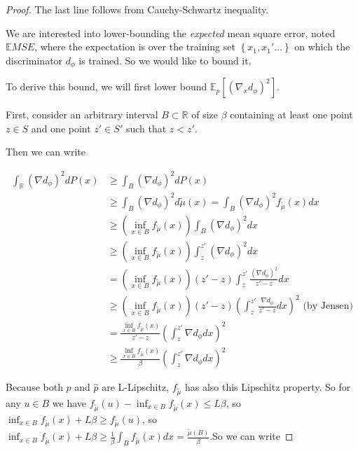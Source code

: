 \begin{proof}
    The last line follows from Cauchy-Schwartz inequality.
    
    We are interested into lower-bounding the \emph{expected} mean square
    error, noted $\mathbb{E}MSE$, where the expectation is over the training
    set $\left\{ x_{1},x_{1}'\ldots\right\} $ on which the discriminator
    $d_{\phi}$ is trained. So we would like to bound it.
    
    To derive this bound, we will first lower bound $\mathbb{E}_{p}\left[\left(\nabla_{x}d_{\phi}\right)^{2}\right]$.
    
    First, consider an arbitrary interval $B\subset\mathbb{R}$ of size
    $\beta$ containing at least one point $z\in S$ and one point $z'\in S'$
    such that $z<z'$.
    
    Then we can write
    
    \begin{align*}
    \int_{\mathbb{R}}\left(\nabla d_{\phi}\right)^{2}dP(x) & \ge\int_{B}\left(\nabla d_{\phi}\right)^{2}dP(x)\\
     & \ge\int_{B}\left(\nabla d_{\phi}\right)^{2}d\tilde{\mu}(x)=\int_{B}\left(\nabla d_{\phi}\right)^{2}f_{\tilde{\mu}}(x)dx\\
     & \ge\left(\inf_{x\in B}f_{\tilde{\mu}}(x)\right)\int_{B}\left(\nabla d_{\phi}\right)^{2}dx\\
     & \ge\left(\inf_{x\in B}f_{\tilde{\mu}}(x)\right)\int_{z}^{z'}\left(\nabla d_{\phi}\right)^{2}dx\\
     & =\left(\inf_{x\in B}f_{\tilde{\mu}}(x)\right)(z'-z)\int_{z}^{z'}\frac{\left(\nabla d_{\phi}\right)^{2}}{z'-z}dx\\
     & \ge\left(\inf_{x\in B}f_{\tilde{\mu}}(x)\right)(z'-z)\left(\int_{z}^{z'}\frac{\nabla d_{\phi}}{z'-z}dx\right)^{2}\text{ (by Jensen)}\\
     & =\frac{\inf_{x\in B}f_{\tilde{\mu}}(x)}{z'-z}\left(\int_{z}^{z'}\nabla d_{\phi}dx\right)^{2}\\
     & \ge\frac{\inf_{x\in B}f_{\tilde{\mu}}(x)}{\beta}\left(\int_{z}^{z'}\nabla d_{\phi}dx\right)^{2}
    \end{align*}
    
    Because both $p$ and $\hat{p}$ are L-Lipschitz, $f_{\tilde{\mu}}$
    has also this Lipschitz property. So for any $u\in B$ we have $f_{\tilde{\mu}}(u)-\inf_{x\in B}f_{\tilde{\mu}}(x)\le L\beta$,
    so $\inf_{x\in B}f_{\tilde{\mu}}(x)+L\beta\ge f_{\tilde{\mu}}(u)$,
    so $\inf_{x\in B}f_{\tilde{\mu}}(x)+L\beta\ge\frac{1}{\beta}\int_{B}f_{\tilde{\mu}}(x)dx=\frac{\tilde{\mu}\left(B\right)}{\beta}$.So
    we can write
    

\end{proof}

